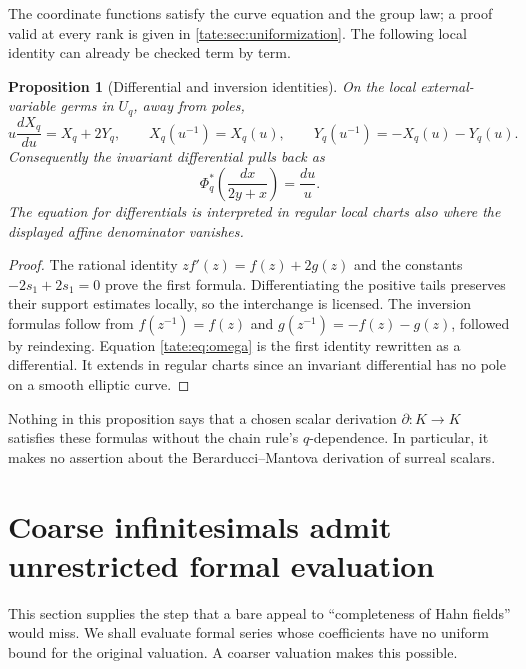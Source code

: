 \documentclass[11pt,letterpaper]{article}
\newtheorem{proposition}[proposition]{Proposition}
\theoremstyle{definition}
\begin{document}
The coordinate functions satisfy the curve equation and the group law;
a proof valid at every rank is given in \cref{tate:sec:uniformization}. The
following local identity can already be checked term by term.

\begin{proposition}[Differential and inversion identities]\label{tate:prop:differential}
On the local external-variable germs in $U_q$, away from poles,
\begin{equation}
 u\frac{dX_q}{du}=X_q+2Y_q,\qquad
 X_q(u^{-1})=X_q(u),\qquad
 Y_q(u^{-1})=-X_q(u)-Y_q(u).\label{tate:eq:diff}
\end{equation}
Consequently the invariant differential pulls back as
\begin{equation}
 \Phi_q^*\left(\frac{dx}{2y+x}\right)=\frac{du}{u}.\label{tate:eq:omega}
\end{equation}
The equation for differentials is interpreted in regular local charts
also where the displayed affine denominator vanishes.
\end{proposition}

\begin{proof}
The rational identity $z f'(z)=f(z)+2g(z)$ and the constants
$-2s_1+2s_1=0$ prove the first formula. Differentiating the positive
 tails preserves their support estimates locally, so the interchange is
licensed. The inversion formulas follow from $f(z^{-1})=f(z)$ and
$g(z^{-1})=-f(z)-g(z)$, followed by reindexing. Equation
\eqref{tate:eq:omega} is the first identity rewritten as a differential.
It extends in regular charts since an invariant differential has no
pole on a smooth elliptic curve.
\end{proof}

Nothing in this proposition says that a chosen scalar derivation
$\partial:K\to K$ satisfies these formulas without the chain rule's
$q$-dependence. In particular, it makes no assertion about the
Berarducci--Mantova derivation of surreal scalars.

\section{Coarse infinitesimals admit unrestricted formal evaluation}\label{tate:sec:coarse}

This section supplies the step that a bare appeal to ``completeness of
Hahn fields'' would miss. We shall evaluate formal series whose
coefficients have no uniform bound for the original valuation. A coarser
valuation makes this possible.
\end{document}

